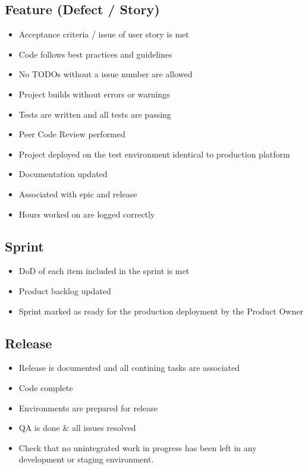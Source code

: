 \subsection{Feature (Defect / Story)}
\begin{itemize}
    \item Acceptance criteria / issue of user story is met 
    \item Code follows best practices and guidelines 
    \item No TODOs without a issue number are allowed 
    \item Project builds without errors or warnings 
    \item Tests are written and all tests are passing 
    \item Peer Code Review performed 
    \item Project deployed on the test environment identical to production platform 
    \item Documentation updated 
    \item Associated with epic and release 
    \item Hours worked on are logged correctly 
\end{itemize}

\subsection{Sprint}
\begin{itemize}
    \item DoD of each item included in the sprint is met 
    \item Product backlog updated 
    \item Sprint marked as ready for the production deployment by the Product Owner 
\end{itemize}

\subsection{Release}
\begin{itemize}
    \item Release is documented and all contining tasks are associated 
    \item Code complete 
    \item Environments are prepared for release 
    \item QA is done \& all issues resolved 
    \item Check that no unintegrated work in progress has been left in any development or staging environment. 
\end{itemize}

